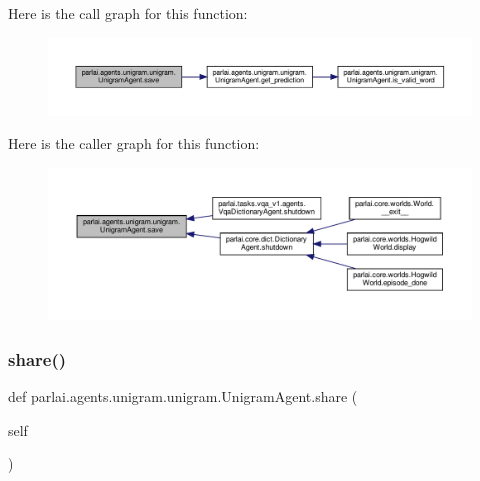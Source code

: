 Here is the call graph for this function\+:
\nopagebreak
\begin{figure}[H]
\begin{center}
\leavevmode
\includegraphics[width=350pt]{classparlai_1_1agents_1_1unigram_1_1unigram_1_1UnigramAgent_ae0178adc22b61bc37632eed426f853df_cgraph}
\end{center}
\end{figure}
Here is the caller graph for this function\+:
\nopagebreak
\begin{figure}[H]
\begin{center}
\leavevmode
\includegraphics[width=350pt]{classparlai_1_1agents_1_1unigram_1_1unigram_1_1UnigramAgent_ae0178adc22b61bc37632eed426f853df_icgraph}
\end{center}
\end{figure}
\mbox{\label{classparlai_1_1agents_1_1unigram_1_1unigram_1_1UnigramAgent_a92213f8bec03859a310d5535a077e999}} 
\subsubsection{\texorpdfstring{share()}{share()}}
{\footnotesize\ttfamily def parlai.\+agents.\+unigram.\+unigram.\+Unigram\+Agent.\+share (\begin{DoxyParamCaption}\item[{}]{self }\end{DoxyParamCaption})}

